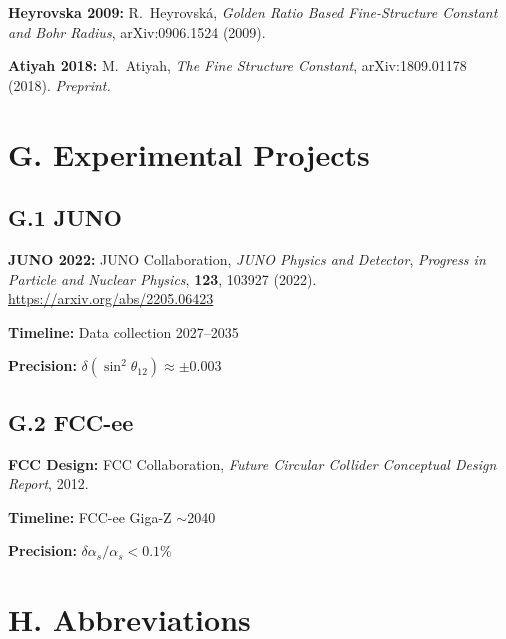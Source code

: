 \documentclass[10pt,a4paper]{article}
\begin{document}
\noindent\textbf{Heyrovska 2009:} R.~Heyrovsk\'{a}, \textit{Golden Ratio Based Fine-Structure Constant and Bohr Radius}, arXiv:0906.1524 (2009).

\noindent\textbf{Atiyah 2018:} M.~Atiyah, \textit{The Fine Structure Constant}, arXiv:1809.01178 (2018). \textit{Preprint.}

\section*{G. Experimental Projects}

\subsection*{G.1 JUNO}

\noindent\textbf{JUNO 2022:} JUNO Collaboration, \textit{JUNO Physics and Detector}, \textit{Progress in Particle and Nuclear Physics}, \textbf{123}, 103927 (2022). \url{https://arxiv.org/abs/2205.06423}

\textbf{Timeline:} Data collection 2027--2035

\textbf{Precision:} $\delta(\sin^2\theta_{12}) \approx \pm 0.003$

\subsection*{G.2 FCC-ee}

\noindent\textbf{FCC Design:} FCC Collaboration, \textit{Future Circular Collider Conceptual Design Report}, 2012.

\textbf{Timeline:} FCC-ee Giga-Z $\sim$2040

\textbf{Precision:} $\delta\alpha_s/\alpha_s < 0.1\%$

\section*{H. Abbreviations}
\end{document}
